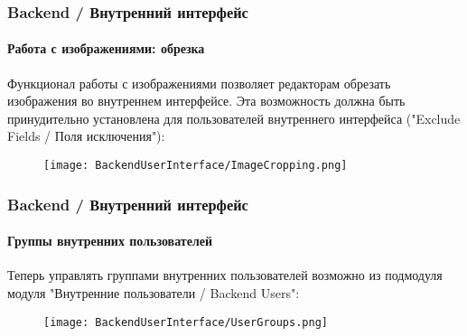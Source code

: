 \begin{frame}[fragile]
	\frametitle{Backend / Внутренний интерфейс}
	\framesubtitle{Работа с изображениями: обрезка}

	Функционал работы с изображениями позволяет редакторам обрезать изображения во
	 внутреннем интерфейсе. Эта возможность должна быть принудительно установлена
	  для пользователей внутреннего интерфейса ("Exclude Fields / Поля исключения"):

	\begin{figure}
		\texttt{[image: BackendUserInterface/ImageCropping.png]}
	\end{figure}

\end{frame}

\begin{frame}[fragile]
	\frametitle{Backend / Внутренний интерфейс}
	\framesubtitle{Группы внутренних пользователей}

	Теперь управлять группами внутренних пользователей возможно из подмодуля модуля
	"Внутренние пользователи / Backend Users":

	\begin{figure}
		\texttt{[image: BackendUserInterface/UserGroups.png]}
	\end{figure}

\end{frame}

